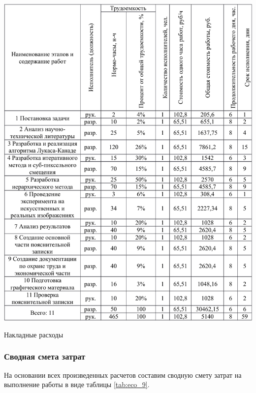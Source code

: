 \begin{table}[h!]
\centering
\includegraphics[page=8, width=0.9\linewidth]{econom_table.pdf}
\caption{Накладные расходы}
\label{tab:eco_8}
\end{table}

\subsubsection{Сводная смета затрат}

На основании всех произведенных расчетов составим сводную смету затрат на выполнение работы в виде таблицы \ref{tab:eco_9}.

